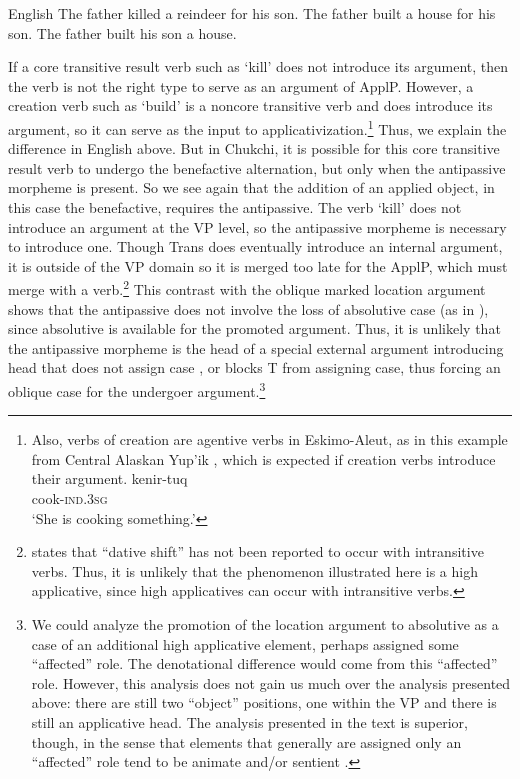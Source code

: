 \documentclass[output=paper,colorlinks,citecolor=brown,modfonts,nonflat]{langsci/langscibook}
\begin{document}
\newpage
\ea%
    English\label{ex:basilico:14}
    \ea The father killed a reindeer for his son.
   	\ex The father built a house for his son.
   	\ex The father built his son a house.
    \z
    \z

If a core transitive result verb such as ‘kill’ does not introduce its argument, then the verb is not the right type to serve as an argument of ApplP. However, a creation verb such as ‘build’ is a noncore transitive verb and does introduce its argument, so it can serve as the input to applicativization.\footnote{Also, verbs of creation are agentive verbs in Eskimo-Aleut, as in this example from Central Alaskan Yup’ik \citep{Miyaoka2012}, which is expected if creation verbs introduce their argument.
\ea
\gll kenir-tuq\\
cook-\textsc{ind.3sg}\\
\glt `She is cooking something.'
\zlast} Thus, we explain the difference in English above. But in Chukchi, it is possible for this core transitive result verb to undergo the benefactive alternation, but only when the antipassive morpheme is present. So we see again that the addition of an applied object, in this case the benefactive, requires the antipassive. The verb ‘kill’ does not introduce an argument at the VP level, so the antipassive morpheme is necessary to introduce one. Though Trans does eventually introduce an internal argument, it is outside of the VP domain so it is merged too late for the ApplP, which must merge with a verb.\footnote{\citet{Spencer1995} states that ``dative shift'' has not been reported to occur with intransitive verbs. Thus, it is unlikely that the phenomenon illustrated here is a high applicative, since high applicatives can occur with intransitive verbs.} This contrast with the oblique marked location argument shows that the antipassive does not involve the loss of absolutive case (as in \citealt{Baker1988}), since absolutive is available for the promoted argument. Thus, it is unlikely that the antipassive morpheme is the head of a special external argument introducing {\liv} head that does not assign case \citep{Levin2015}, or blocks T from assigning case, thus forcing an oblique case for the undergoer argument.\footnote{We could analyze the promotion of the location argument to absolutive as a case of an additional high applicative element, perhaps assigned some ``affected'' role. The denotational difference would come from this ``affected'' role. However, this analysis does not gain us much over the analysis presented above: there are still two ``object'' positions, one within the VP and there is still an applicative head. The analysis presented in the text is superior, though, in the sense that elements that generally are assigned only an ``affected'' role tend to be animate and/or sentient \citep{BosseEtAl2012}.}
\end{document}
